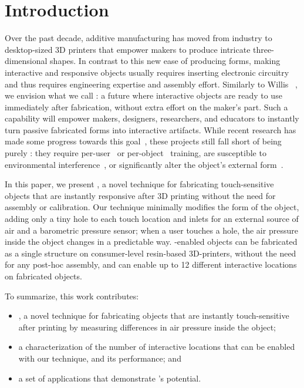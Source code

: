 	\section{Introduction}
		Over the past decade, additive manufacturing has moved from industry to
		desktop-sized 3D printers that empower makers to produce intricate
		three-dimensional shapes. In contrast to this new ease of producing forms,
		making interactive and responsive objects usually requires inserting
		electronic circuitry~\cite{Ramakers:2016, Savage:2015a} and thus requires
		engineering expertise and assembly effort. Similarly to Willis
		\etal~\cite{Willis:2012}, we envision what we call \textit{\pap}: a future
		where interactive objects are ready to use immediately after fabrication,
		without extra effort on the maker's part. Such a capability will empower
		makers, designers, researchers, and educators to instantly turn passive
		fabricated forms into interactive artifacts. While recent research has made
		some progress towards this goal~\cite{Tejada:2018, Schmitz:2019, Ono:2013,
		Shi:2016}, these projects still fall short of being purely \pap: they
		require per-user~\cite{Shi:2016} or per-object~\cite{Tejada:2018,Ono:2013}
		training, are susceptible to environmental
		interference~\cite{Tejada:2018,Shi:2016}, or significantly alter the
		object's external form~\cite{Shi:2016}.

		In this paper, we present \emph{\at}, a novel technique for fabricating
		touch-sensitive objects that are instantly responsive after 3D printing
		without the need for assembly or calibration. Our technique minimally
		modifies the form of the object, adding only a tiny hole to each touch
		location and inlets for an external source of air and a barometric pressure
		sensor; when a user touches a hole, the air pressure inside the object
		changes in a predictable way. \at-enabled objects can be fabricated as a
		single structure on consumer-level resin-based 3D-printers, without the need
		for any post-hoc assembly, and can enable up to 12 different interactive
		locations on fabricated objects.

		To summarize, this work contributes:
		\begin{itemize}
			\item \emph{\at}, a novel technique for fabricating objects that are
				instantly touch-sensitive after printing by measuring differences in air
				pressure inside the object;
			\item a characterization of the number of interactive locations that can
				be enabled with our technique, and its performance; and
			\item a set of applications that demonstrate \at's potential.
		\end{itemize}


